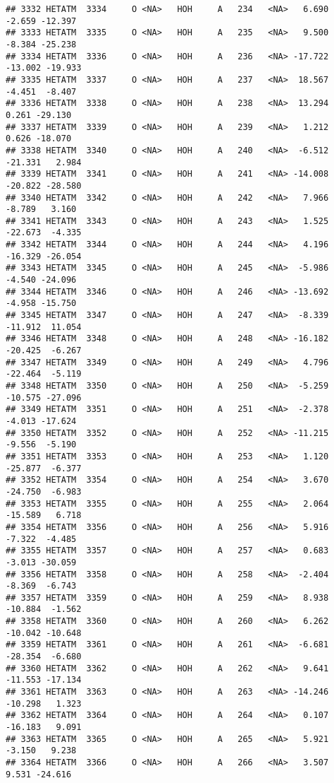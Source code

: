 \documentclass[
]{article}
\begin{document}
\begin{verbatim}
## 3332 HETATM  3334     O <NA>   HOH     A   234   <NA>   6.690  -2.659 -12.397
## 3333 HETATM  3335     O <NA>   HOH     A   235   <NA>   9.500  -8.384 -25.238
## 3334 HETATM  3336     O <NA>   HOH     A   236   <NA> -17.722 -13.002 -19.933
## 3335 HETATM  3337     O <NA>   HOH     A   237   <NA>  18.567  -4.451  -8.407
## 3336 HETATM  3338     O <NA>   HOH     A   238   <NA>  13.294   0.261 -29.130
## 3337 HETATM  3339     O <NA>   HOH     A   239   <NA>   1.212   0.626 -18.070
## 3338 HETATM  3340     O <NA>   HOH     A   240   <NA>  -6.512 -21.331   2.984
## 3339 HETATM  3341     O <NA>   HOH     A   241   <NA> -14.008 -20.822 -28.580
## 3340 HETATM  3342     O <NA>   HOH     A   242   <NA>   7.966  -8.789   3.160
## 3341 HETATM  3343     O <NA>   HOH     A   243   <NA>   1.525 -22.673  -4.335
## 3342 HETATM  3344     O <NA>   HOH     A   244   <NA>   4.196 -16.329 -26.054
## 3343 HETATM  3345     O <NA>   HOH     A   245   <NA>  -5.986  -4.540 -24.096
## 3344 HETATM  3346     O <NA>   HOH     A   246   <NA> -13.692  -4.958 -15.750
## 3345 HETATM  3347     O <NA>   HOH     A   247   <NA>  -8.339 -11.912  11.054
## 3346 HETATM  3348     O <NA>   HOH     A   248   <NA> -16.182 -20.425  -6.267
## 3347 HETATM  3349     O <NA>   HOH     A   249   <NA>   4.796 -22.464  -5.119
## 3348 HETATM  3350     O <NA>   HOH     A   250   <NA>  -5.259 -10.575 -27.096
## 3349 HETATM  3351     O <NA>   HOH     A   251   <NA>  -2.378  -4.013 -17.624
## 3350 HETATM  3352     O <NA>   HOH     A   252   <NA> -11.215  -9.556  -5.190
## 3351 HETATM  3353     O <NA>   HOH     A   253   <NA>   1.120 -25.877  -6.377
## 3352 HETATM  3354     O <NA>   HOH     A   254   <NA>   3.670 -24.750  -6.983
## 3353 HETATM  3355     O <NA>   HOH     A   255   <NA>   2.064 -15.589   6.718
## 3354 HETATM  3356     O <NA>   HOH     A   256   <NA>   5.916  -7.322  -4.485
## 3355 HETATM  3357     O <NA>   HOH     A   257   <NA>   0.683  -3.013 -30.059
## 3356 HETATM  3358     O <NA>   HOH     A   258   <NA>  -2.404  -8.369  -6.743
## 3357 HETATM  3359     O <NA>   HOH     A   259   <NA>   8.938 -10.884  -1.562
## 3358 HETATM  3360     O <NA>   HOH     A   260   <NA>   6.262 -10.042 -10.648
## 3359 HETATM  3361     O <NA>   HOH     A   261   <NA>  -6.681 -28.354  -6.680
## 3360 HETATM  3362     O <NA>   HOH     A   262   <NA>   9.641 -11.553 -17.134
## 3361 HETATM  3363     O <NA>   HOH     A   263   <NA> -14.246 -10.298   1.323
## 3362 HETATM  3364     O <NA>   HOH     A   264   <NA>   0.107 -16.183   9.091
## 3363 HETATM  3365     O <NA>   HOH     A   265   <NA>   5.921  -3.150   9.238
## 3364 HETATM  3366     O <NA>   HOH     A   266   <NA>   3.507   9.531 -24.616

\end{verbatim}
\end{document}
